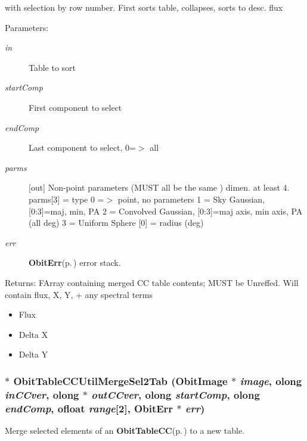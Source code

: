 with selection by row number. First sorts table, collapses, sorts to desc. flux \begin{Desc}
\item[Parameters:]
\begin{description}
\item[{\em in}]Table to sort \item[{\em start\-Comp}]First component to select \item[{\em end\-Comp}]Last component to select, 0=$>$ all \item[{\em parms}][out] Non-point parameters (MUST all be the same ) dimen. at least 4. parms[3] = type 0 =$>$ point, no parameters 1 = Sky Gaussian, [0:3]=maj, min, PA 2 = Convolved Gaussian, [0:3]=maj axis, min axis, PA (all deg) 3 = Uniform Sphere [0] = radius (deg) \item[{\em err}]{\bf Obit\-Err}{\rm (p.\,\pageref{structObitErr})} error stack. \end{description}
\end{Desc}
\begin{Desc}
\item[Returns:]FArray containing merged CC table contents; MUST be Unreffed. Will contain flux, X, Y, + any spectral terms \begin{itemize}
\item Flux \item Delta X \item Delta Y \end{itemize}
\end{Desc}
\subsubsection{$\ast$ Obit\-Table\-CCUtil\-Merge\-Sel2Tab ({\bf Obit\-Image} $\ast$ {\em image}, {\bf olong} {\em in\-CCver}, {\bf olong} $\ast$ {\em out\-CCver}, {\bf olong} {\em start\-Comp}, {\bf olong} {\em end\-Comp}, {\bf ofloat} {\em range}[2], {\bf Obit\-Err} $\ast$ {\em err})}\label{ObitTableCCUtil_8h_a13}


Merge selected elements of an {\bf Obit\-Table\-CC}{\rm (p.\,\pageref{structObitTableCC})} to a new table. 

